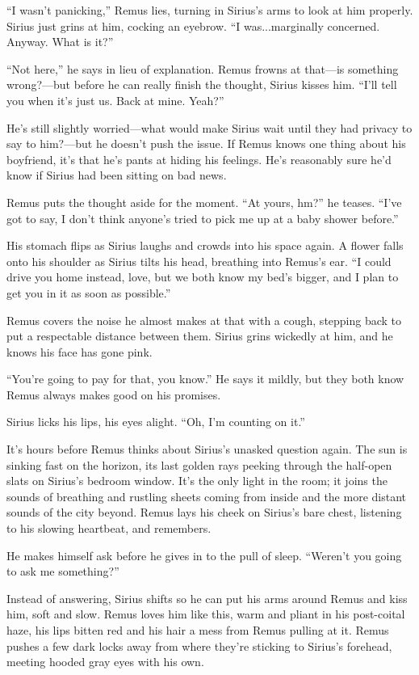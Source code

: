 “I wasn’t panicking,” Remus lies, turning in Sirius’s arms to look at him properly. Sirius just grins at him, cocking an eyebrow. “I was...marginally concerned. Anyway. What is it?”

“Not here,” he says in lieu of explanation. Remus frowns at that—is something wrong?—but before he can really finish the thought, Sirius kisses him. “I’ll tell you when it’s just us. Back at mine. Yeah?”

He’s still slightly worried—what would make Sirius wait until they had privacy to say to him?—but he doesn’t push the issue. If Remus knows one thing about his boyfriend, it’s that he’s pants at hiding his feelings. He’s reasonably sure he’d know if Sirius had been sitting on bad news.

Remus puts the thought aside for the moment. “At yours, hm?” he teases. “I’ve got to say, I don’t think anyone’s tried to pick me up at a baby shower before.”

His stomach flips as Sirius laughs and crowds into his space again. A flower falls onto his shoulder as Sirius tilts his head, breathing into Remus’s ear. “I could drive you home instead, love, but we both know my bed’s bigger, and I plan to get you in it as soon as possible.”

Remus covers the noise he almost makes at that with a cough, stepping back to put a respectable distance between them. Sirius grins wickedly at him, and he knows his face has gone pink.

“You’re going to pay for that, you know.” He says it mildly, but they both know Remus always makes good on his promises.

Sirius licks his lips, his eyes alight. “Oh, I’m counting on it.”

It’s hours before Remus thinks about Sirius’s unasked question again. The sun is sinking fast on the horizon, its last golden rays peeking through the half-open slats on Sirius’s bedroom window. It’s the only light in the room; it joins the sounds of breathing and rustling sheets coming from inside and the more distant sounds of the city beyond. Remus lays his cheek on Sirius’s bare chest, listening to his slowing heartbeat, and remembers.

He makes himself ask before he gives in to the pull of sleep. “Weren’t you going to ask me something?”

Instead of answering, Sirius shifts so he can put his arms around Remus and kiss him, soft and slow. Remus loves him like this, warm and pliant in his post-coital haze, his lips bitten red and his hair a mess from Remus pulling at it. Remus pushes a few dark locks away from where they’re sticking to Sirius’s forehead, meeting hooded gray eyes with his own.

